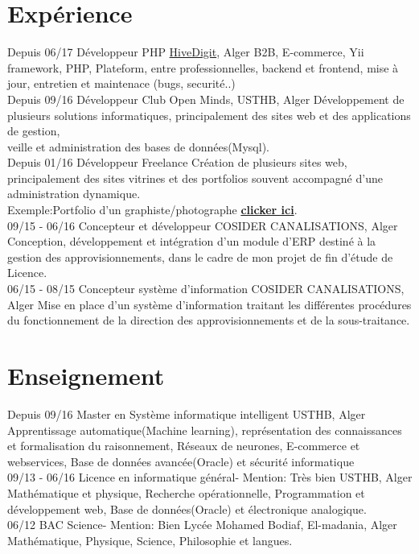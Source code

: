 \documentclass[]{friggeri-cv}
\begin{document}
\section{Expérience}
\begin{entrylist}
  \entry
    {Depuis 06/17}
    {Développeur PHP}
    {\href{http://www.hivedigit.com/}{HiveDigit}, Alger}
    {B2B, E-commerce, Yii framework, PHP, Plateform, entre professionnelles, backend et frontend, mise à jour, entretien et maintenace (bugs, securité..)\\}
  \entry
    {Depuis 09/16}
    {Développeur}
    {Club Open Minds, USTHB, Alger}
    {Développement de plusieurs solutions informatiques, principalement des sites web et des applications de gestion,\\veille et administration des bases de données(Mysql).\\}
  \entry
    {Depuis 01/16}
    {Développeur Freelance}
    {}
    {Création de plusieurs sites web, principalement des sites vitrines et des portfolios souvent accompagné d'une administration dynamique.\\
    Exemple:Portfolio d'un graphiste/photographe \href{http://www.samirouferhat.com/}{\textbf{clicker ici}}.\\}
  \entry
    {09/15 - 06/16}
    {Concepteur et développeur}
    {COSIDER CANALISATIONS, Alger}
    {Conception, développement et intégration d'un module d'ERP destiné à la gestion des approvisionnements, dans le cadre de mon projet de fin d'étude de Licence.\\}
  \entry
    {06/15 - 08/15}
    {Concepteur système d'information}
    {COSIDER CANALISATIONS, Alger}
    {Mise en place d'un système d'information traitant les différentes procédures du fonctionnement de la direction des approvisionnements et de la sous-traitance.\\}
\end{entrylist}
\vspace{1cm}
\section{Enseignement}
\begin{entrylist}
  \entry
    {Depuis 09/16}
    {Master en  Système informatique intelligent}
    {USTHB, Alger}
    {Apprentissage automatique(Machine learning), représentation des connaissances et formalisation du raisonnement, Réseaux de neurones, E-commerce et webservices, Base de données avancée(Oracle) et sécurité informatique\\}
  \entry
    {09/13 - 06/16}
    {Licence en informatique général- Mention: Très bien}
    {USTHB, Alger}
    {Mathématique et physique, Recherche opérationnelle, Programmation et développement web,  Base de données(Oracle) et électronique analogique.\\}
  \entry
    {06/12}
    {BAC Science- Mention: Bien}
    {Lycée Mohamed Bodiaf, El-madania, Alger}
    {Mathématique, Physique, Science, Philosophie et langues.}
\end{entrylist}
\end{document}

